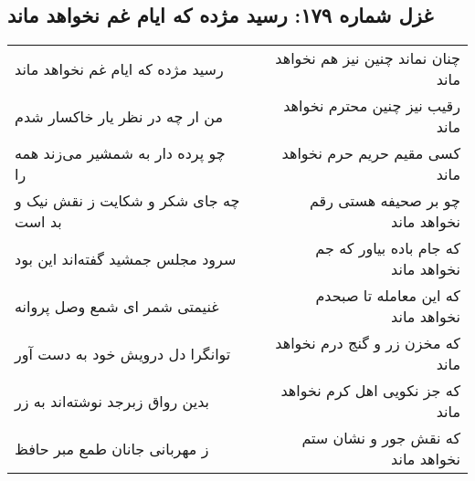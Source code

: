 \begin{center}
\section*{غزل شماره ۱۷۹: رسید مژده که ایام غم نخواهد ماند}
\label{sec:sh179}
\begin{longtable}{l p{0.5cm} r}
رسید مژده که ایام غم نخواهد ماند
&&
چنان نماند چنین نیز هم نخواهد ماند
\\
من ار چه در نظر یار خاکسار شدم
&&
رقیب نیز چنین محترم نخواهد ماند
\\
چو پرده دار به شمشیر می‌زند همه را
&&
کسی مقیم حریم حرم نخواهد ماند
\\
چه جای شکر و شکایت ز نقش نیک و بد است
&&
چو بر صحیفه هستی رقم نخواهد ماند
\\
سرود مجلس جمشید گفته‌اند این بود
&&
که جام باده بیاور که جم نخواهد ماند
\\
غنیمتی شمر ای شمع وصل پروانه
&&
که این معامله تا صبحدم نخواهد ماند
\\
توانگرا دل درویش خود به دست آور
&&
که مخزن زر و گنج درم نخواهد ماند
\\
بدین رواق زبرجد نوشته‌اند به زر
&&
که جز نکویی اهل کرم نخواهد ماند
\\
ز مهربانی جانان طمع مبر حافظ
&&
که نقش جور و نشان ستم نخواهد ماند
\\
\end{longtable}
\end{center}
